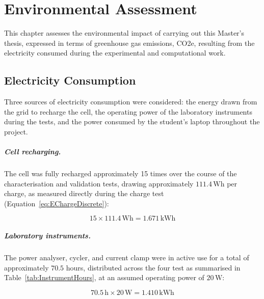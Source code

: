 \chapter{Environmental Assessment}\label{sec:EnvironmentalAssessment}

This chapter assesses the environmental impact of carrying out this Master's 
thesis, expressed in terms of greenhouse gas emissions, \ac{CO2e}, resulting 
from the electricity consumed during the experimental and computational work.

\section{Electricity Consumption}

Three sources of electricity consumption were considered: the energy drawn from 
the grid to recharge the cell, the operating power of the laboratory instruments 
during the tests, and the power consumed by the student's laptop 
throughout the project.

\paragraph{Cell recharging.} The cell was fully recharged approximately 15 times 
over the course of the characterisation and validation tests, drawing 
approximately $111.4\,\text{Wh}$ per charge, as measured directly during the 
charge test (Equation~\ref{eq:EChargeDiscrete}):

\begin{equation}
    15 \times 111.4\,\text{Wh} = 1.671\,\text{kWh}
\end{equation}

\paragraph{Laboratory instruments.} The power analyser, cycler, and current clamp 
were in active use for a total of approximately $70.5$ hours, distributed across 
the four test as summarised in Table~\ref{tab:InstrumentHours}, at an 
assumed operating power of $20\,\text{W}$:

\begin{equation}
    70.5\,\text{h} \times 20\,\text{W} = 1.410\,\text{kWh}
\end{equation}

